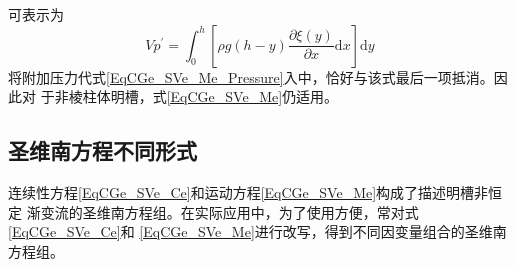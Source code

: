                                                         可表示为
                                                        \begin{equation}
                                                          Vp^{\prime}
                                                          =
                                                          \int_{0}^{h}\!
                                                          \left[
                                                            \rho g(h-y)
                                                            \frac{\partial \xi(y)}{\partial x}
                                                            \mathrm{d}x
                                                          \right]
                                                          \mathrm{d}y
                                                        \end{equation}
                                                        将附加压力代式\eqref{EqCGe_SVe_Me_Pressure}入中，恰好与该式最后一项抵消。因此对
                                                        于非棱柱体明槽，式\eqref{EqCGe_SVe_Me}仍适用。

                                                        \subsection{圣维南方程不同形式}
                                                        连续性方程\eqref{EqCGe_SVe_Ce}和运动方程\eqref{EqCGe_SVe_Me}构成了描述明槽非恒定
                                                        渐变流的圣维南方程组。在实际应用中，为了使用方便，常对式\eqref{EqCGe_SVe_Ce}和
                                                        \eqref{EqCGe_SVe_Me}进行改写，得到不同因变量组合的圣维南方程组。



